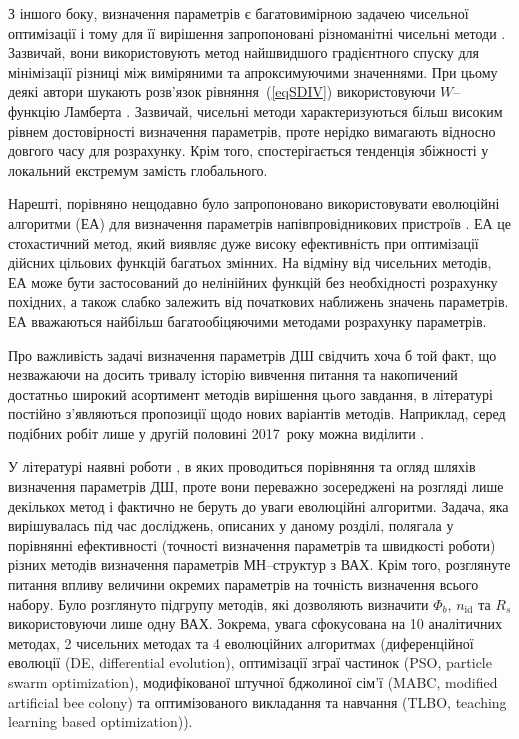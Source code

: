 З іншого боку, визначення параметрів є багатовимірною задачею чисельної оптимізації і тому для її вирішення запропоновані різноманітні чисельні методи \cite{Ortiz1999,Evangelou,Donoval,Ferhat}.
Зазвичай, вони використовують метод найшвидшого градієнтного спуску для мінімізації різниці між виміряними та апроксимуючими значеннями.
При цьому деякі автори\cite{Lambert_Jung,Ortiz2005} шукають розв'язок рівняння~(\ref{eqSDIV}) використовуючи $W$--функцію Ламберта
\cite{LambertBook}.
Зазвичай, чисельні методи характеризуються більш високим рівнем достовірності визначення параметрів, проте нерідко вимагають відносно довгого часу для розрахунку.
Крім того, спостерігається тенденція збіжності у локальний екстремум замість глобального.

Нарешті, порівняно нещодавно було запропоновано використовувати еволюційні алгоритми (ЕА) для визначення параметрів напівпровідникових пристроїв \cite{PSO_Ye,DEWang,GA_Li,P-DE_Ishaque,TLBO_Patel,MABC,PSOWang,GA_Schottky}.
ЕА це стохастичний метод, який виявляє дуже високу ефективність при оптимізації дійсних цільових функцій багатьох змінних.
На відміну від чисельних методів, ЕА може бути застосований до нелінійних функцій без необхідності розрахунку похідних, а також слабко залежить від початкових наближень значень параметрів.
ЕА вважаються \cite{P-DE_Ishaque} найбільш багатообіцяючими  методами розрахунку параметрів.

Про важливість задачі визначення параметрів ДШ свідчить хоча б той факт, що
незважаючи на досить тривалу історію вивчення питання та накопичений достатньо широкий асортимент методів вирішення цього завдання,
в літературі постійно з'являються пропозиції щодо нових варіантів методів.
Наприклад, серед подібних робіт лише у другій половині 2017~року можна виділити \cite{Noise:Roy,MikhelashviliJAP2017,Cataldo,ORTIZCONDE2018}.

У літературі наявні роботи \cite{Evangelou,Aubry,Kudryk}, в яких проводиться порівняння  та огляд шляхів визначення параметрів ДШ, проте вони переважно зосереджені на розгляді лише декількох метод і фактично не беруть до уваги еволюційні алгоритми.
Задача, яка вирішувалась під час досліджень, описаних у даному розділі, полягала у порівнянні ефективності (точності визначення параметрів та швидкості роботи) різних методів визначення параметрів МН--структур з ВАХ.
Крім того, розглянуте питання впливу величини окремих параметрів на точність визначення всього набору.
Було розглянуто підгрупу методів, які дозволяють визначити $\Phi_b$, $n_\mathrm{id}$ та $R_s$ використовуючи лише одну ВАХ.
Зокрема, увага сфокусована на 10 аналітичних методах, 2 чисельних методах та 4 еволюційних алгоритмах
(диференційної еволюції (DE, differential evolution),
оптимізації зграї частинок (PSO, particle swarm optimization),
модифікованої штучної бджолиної сім'ї (MABC, modified artificial bee colony) та
оптимізованого викладання та навчання (TLBO, teaching learning based optimization)).


